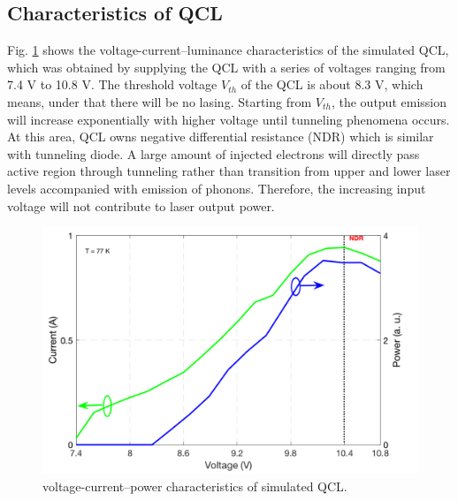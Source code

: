 \documentclass[11pt,final]{scrbook}
\begin{document}
\subsection{Characteristics of QCL}
Fig. \ref{fig:IVcurve} shows the voltage-current–luminance characteristics of the simulated QCL, which was obtained by supplying the QCL with a series of voltages ranging from 7.4 V to 10.8 V. The threshold voltage $V_{th}$ of the QCL is about 8.3 V, which means, under that there will be no lasing. Starting from $V_{th}$, the output emission will increase exponentially with higher voltage until tunneling phenomena occurs. At this area, QCL owns negative differential resistance (NDR) which is similar with tunneling diode. A large amount of injected electrons will directly pass active region through tunneling rather than transition from upper and lower laser levels accompanied with emission of phonons. Therefore, the increasing input voltage will not contribute to laser output power. 

\begin{figure}[htbp]
\begin{center}
\includegraphics[scale=0.6]{images/IVCURVE.pdf}
\caption{voltage-current–power characteristics of simulated QCL.}
\label{fig:IVcurve}
\end{center}
\end{figure}
\end{document}
